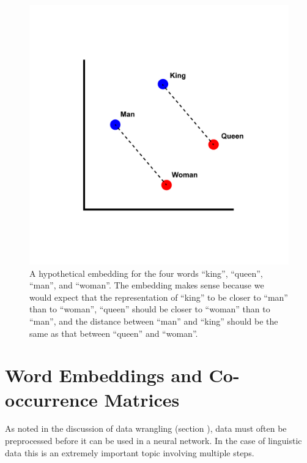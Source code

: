 \begin{figure}[h]
    \centering
    \includegraphics[scale=.2]{./images/Word_vector_illustration.jpg}
    \caption[Example of word embeddings in a semantic space.]{A hypothetical embedding for the four words ``king'', ``queen'', ``man'', and ``woman''.  The embedding makes sense because we would expect that the representation of ``king'' to be closer to ``man'' than to ``woman'', ``queen'' should be closer to ``woman'' than to ``man'', and the distance between ``man'' and ``king'' should be the same as that between ``queen'' and ``woman''.    }
 \label{f:kingQueenExample}
\end{figure}


\section{Word Embeddings and Co-occurrence Matrices}

As noted in the discussion of data wrangling (section ), data must often be preprocessed before it can be used in a neural network. In the case of linguistic data this is an extremely important topic involving multiple steps.  

